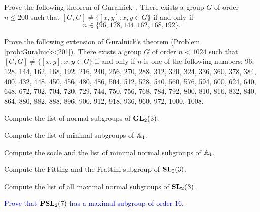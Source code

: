 \begin{prob}
    \label{prob:Guralnick<201}
	Prove the following theorem of Guralnick~\cite{MR673806}. There exists
	a group $G$ of order $n\leq200$ such that $[G,G]\ne\{[x,y]:x,y\in G\}$
	if and only if
	\[
	  n\in\{96,128,144,162,168,192\}.
	\]
\end{prob}

\begin{prob}
    Prove the following extension of Guralnick's theorem (Problem
    \ref{prob:Guralnick<201}). There exists a group $G$ of order $n<1024$ such
    that $[G,G]\ne\{[x,y]:x,y\in G\}$ if and only if $n$ is one of the
    following numbers: 96, 128, 144, 162, 168, 192, 216, 240, 256, 270, 288,
    312, 320, 324, 336, 360, 378, 384, 400, 432, 448, 450, 456, 480, 486, 504,
    512, 528, 540, 560, 576, 594, 600, 624, 640, 648, 672, 702, 704, 720, 729,
    744, 750, 756, 768, 784, 792, 800, 810, 816, 832, 840, 864, 880, 882, 888,
    896, 900, 912, 918, 936, 960, 972, 1000, 1008.
\end{prob}

\begin{prob}
	\label{prob:minimal}
	Compute the list of normal subgroups of $\mathbf{GL}_2(3)$.
\end{prob}

\begin{prob}
	Compute the list of minimal subgroups of $\mathbb{A}_4$.
\end{prob}

\begin{prob}
	\label{prob:socle}
	Compute the socle and the list of minimal normal subgroups of $\mathbb{A}_4$. 
\end{prob}

\begin{prob}
	\label{prob:fitting}
	Compute the Fitting and the Frattini subgroup of $\mathbf{SL}_2(3)$.
\end{prob}

\begin{prob}
	\label{prob:maximal}
	Compute the list of all maximal normal subgroups of $\mathbf{SL}_2(3)$. 
\end{prob}

\begin{prob}
	\label{prob:PSL2(7)_max}
	\textcolor{blue}{Prove that $\mathbf{PSL}_2(7)$ has a maximal subgroup of order 16.}
\end{prob}


